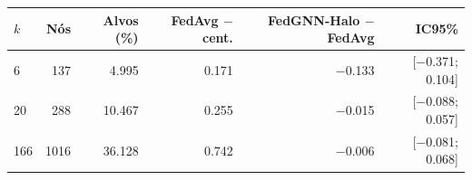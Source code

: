 \begin{tabular}{lrrrrr}\toprule
$k$ & Nós & Alvos (\%) & FedAvg $-$ cent. & \shortstack{FedGNN-Halo\\$-$ FedAvg} & IC95\%\\\midrule
6 & \num{137} & \num{4.995} & \num{0.171} & \num{-0.133} & [\num{-0.371}; \num{0.104}]\\
20 & \num{288} & \num{10.467} & \num{0.255} & \num{-0.015} & [\num{-0.088}; \num{0.057}]\\
166 & \num{1016} & \num{36.128} & \num{0.742} & \num{-0.006} & [\num{-0.081}; \num{0.068}]\\
\bottomrule\end{tabular}
